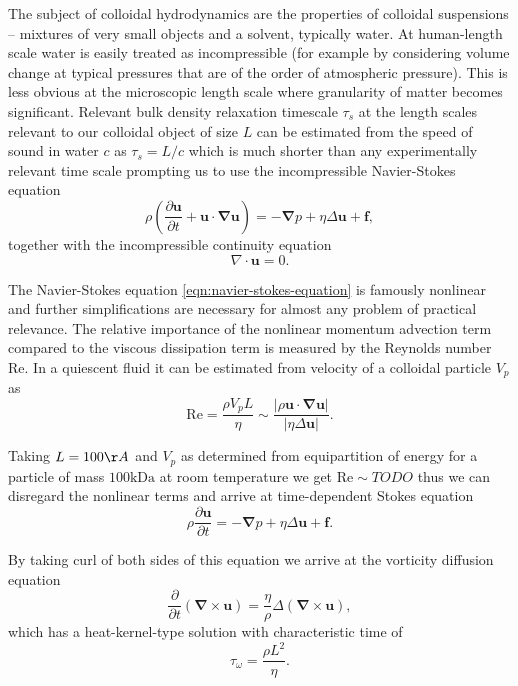 \documentclass{doctoral}
\newcommand{\pd}{\partial}
\newcommand{\Reynolds}{\mathrm{Re}}
\begin{document}
The subject of colloidal hydrodynamics are the properties of colloidal suspensions -- mixtures of very small objects and a solvent, typically water.
At human-length scale water is easily treated as incompressible (for example by considering volume change at typical pressures that are of the order of atmospheric pressure).
This is less obvious at the microscopic length scale where granularity of matter becomes significant.
Relevant bulk density relaxation timescale $\tau_s$ at the length scales relevant to our colloidal object of size $L$ can be estimated from the speed of sound in water $c$ as $\tau_s = L/c$ which is much shorter than any experimentally relevant time scale prompting us to use the incompressible Navier-Stokes equation
\begin{equation}
    \rho \left( \frac{\pd \bm{u}}{\pd t} + \bm{u} \cdot \bm{\nabla u} \right) = - \bm{\nabla} p + \eta \Delta \bm{u} + \bm{f}, \label{eqn:navier-stokes-equation}
\end{equation}
together with the incompressible continuity equation
\begin{equation}
    \nabla \cdot \bm{u} = 0 \label{eqn:incompressibility}.
\end{equation}

The Navier-Stokes equation \eqref{eqn:navier-stokes-equation} is famously nonlinear and further simplifications are necessary for almost any problem of practical relevance.
The relative importance of the nonlinear momentum advection term compared to the viscous dissipation term is measured by the Reynolds number $\Reynolds$.
In a quiescent fluid it can be estimated from velocity of a colloidal particle $V_p$ as
\begin{equation}
    \Reynolds = \frac{\rho V_p L}{\eta} \sim \frac{|\rho \bm{u} \cdot \bm{\nabla}\bm{u}|}{|\eta \Delta \bm{u}|}.
    \label{eqn:reynolds-based-estimate}
\end{equation}

Taking $L = 100\AA{}$ and $V_p$ as determined from equipartition of energy for a particle of mass $100 \mathrm{k Da}$ at room temperature we get $\Reynolds \sim TODO$ thus we can disregard the nonlinear terms and arrive at time-dependent Stokes equation
\begin{equation}
    \rho \frac{\pd \bm{u}}{\pd t} = - \bm{\nabla} p + \eta \Delta \bm{u} + \bm{f}.
    \label{eqn:time-dependent-stokes-equation}
\end{equation}

By taking curl of both sides of this equation we arrive at the vorticity diffusion equation
\begin{equation}
    \frac{\pd}{\pd t} \left( \bm{\nabla} \times \bm{u} \right) = \frac{\eta}{\rho} \Delta \left( \bm{\nabla} \times \bm{u} \right), \label{eqn:vorticity-diffusion}
\end{equation}
which has a heat-kernel-type solution with characteristic time of
\begin{equation}
    \tau_\omega = \frac{\rho L^2}{\eta}.
    \label{eqn:vorticity-timescale}
\end{equation}
\end{document}
